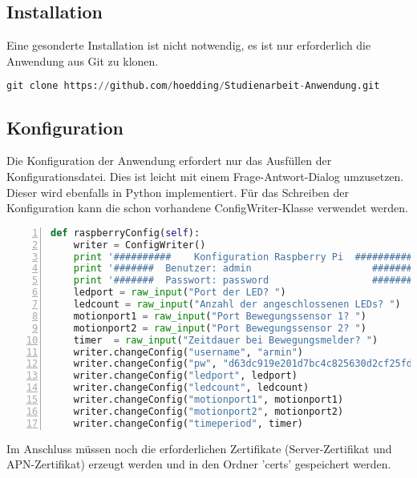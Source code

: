 \subsection{Installation}
Eine gesonderte Installation ist nicht notwendig, es ist nur erforderlich die Anwendung aus Git zu klonen. 
\begin{lstlisting}[caption =Git Clone der Studienarbeit, language=python, frame=single, breaklines=true,columns=fullflexible, commentstyle=\color{gray}\upshape, captionpos=b]
git clone https://github.com/hoedding/Studienarbeit-Anwendung.git
\end{lstlisting}

\subsection{Konfiguration}
Die Konfiguration der Anwendung erfordert nur das Ausfüllen der Konfigurationsdatei. Dies ist leicht mit einem Frage-Antwort-Dialog umzusetzen. Dieser wird ebenfalls in Python implementiert. Für das Schreiben der Konfiguration kann die schon vorhandene ConfigWriter-Klasse verwendet werden. 
\begin{lstlisting}[caption =Implementierung setup.py, language=python, frame=single, breaklines=true,columns=fullflexible, commentstyle=\color{gray}\upshape, captionpos=b, numbers = left]
def raspberryConfig(self):
    writer = ConfigWriter()
    print '##########    Konfiguration Raspberry Pi  ###########'
    print '#######  Benutzer: admin                     ########'
    print '#######  Passwort: password                  ########'
    ledport = raw_input("Port der LED? ")
    ledcount = raw_input("Anzahl der angeschlossenen LEDs? ")
    motionport1 = raw_input("Port Bewegungssensor 1? ")
    motionport2 = raw_input("Port Bewegungssensor 2? ")
    timer  = raw_input("Zeitdauer bei Bewegungsmelder? ")
    writer.changeConfig("username", "armin")
    writer.changeConfig("pw", "d63dc919e201d7bc4c825630d2cf25fdc93d4b2f0d46706d29038d01")
    writer.changeConfig("ledport", ledport)
    writer.changeConfig("ledcount", ledcount)
    writer.changeConfig("motionport1", motionport1)
    writer.changeConfig("motionport2", motionport2)
    writer.changeConfig("timeperiod", timer)
\end{lstlisting}
Im Anschluss müssen noch die erforderlichen Zertifikate (Server-Zertifikat und APN-Zertifikat) erzeugt werden und in den Ordner 'certs' gespeichert werden. 
